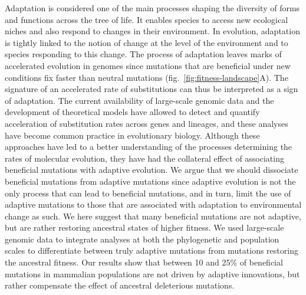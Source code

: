 Adaptation is considered one of the main processes shaping the diversity of forms and functions across the tree of life\cite{darwin_origin_1859}.
It enables species to access new ecological niches and also respond to changes in their environment\cite{gavrilets_adaptive_2009}.
In evolution, adaptation is tightly linked to the notion of change at the level of the environment and to species responding to this change\cite{merrell_adaptive_1994}.
The process of adaptation leaves marks of accelerated evolution in genomes since mutations that are beneficial under new conditions fix faster than neutral mutations (fig.~\ref{fig:fitness-landscape}A).
The signature of an accelerated rate of substitutions can thus be interpreted as a sign of adaptation\cite{mcdonald_adaptative_1991, smith_adaptive_2002, welch_estimating_2006}.
The current availability of large-scale genomic data and the development of theoretical models have allowed to detect and quantify acceleration of substitution rates across genes and lineages, and these analyses have become common practice in evolutionary biology\cite{yang_statistical_2000, eyre-walker_genomic_2006, moutinho_variation_2019}.
Although these approaches have led to a better understanding of the processes determining the rates of molecular evolution, they have had the collateral effect of associating beneficial mutations with adaptive evolution.
We argue that we should dissociate beneficial mutations from adaptive mutations since adaptive evolution is not the only process that can lead to beneficial mutations\cite{charlesworth_other_2007, mustonen_fitness_2009}, and in turn, limit the use of adaptive mutations to those that are associated with adaptation to environmental change as such.
We here suggest that many beneficial mutations are not adaptive, but are rather restoring ancestral states of higher fitness.
We used large-scale genomic data to integrate analyses at both the phylogenetic and population scales to differentiate between truly adaptive mutations from mutations restoring the ancestral fitness.
Our results show that between 10 and 25\% of beneficial mutations in mammalian populations are not driven by adaptive innovations, but rather compensate the effect of ancestral deleterious mutations.

